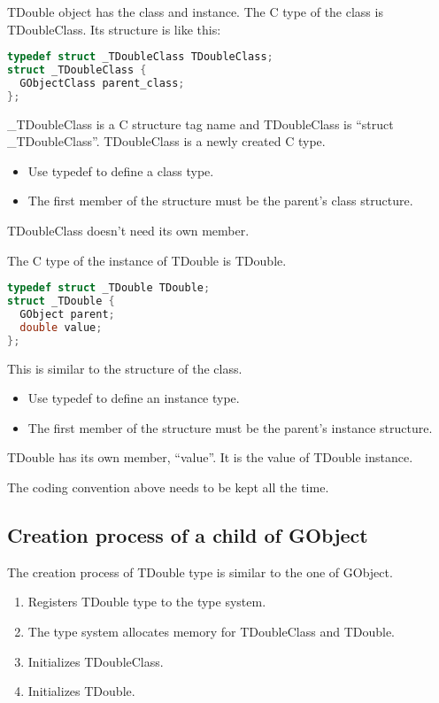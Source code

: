 TDouble object has the class and instance. The C type of the class is
TDoubleClass. Its structure is like this:

\begin{lstlisting}[language=C]
typedef struct _TDoubleClass TDoubleClass;
struct _TDoubleClass {
  GObjectClass parent_class;
};
\end{lstlisting}

\_TDoubleClass is a C structure tag name and TDoubleClass is ``struct
\_TDoubleClass''. TDoubleClass is a newly created C type.

\begin{itemize}
\tightlist
\item
  Use typedef to define a class type.
\item
  The first member of the structure must be the parent's class
  structure.
\end{itemize}

TDoubleClass doesn't need its own member.

The C type of the instance of TDouble is TDouble.

\begin{lstlisting}[language=C]
typedef struct _TDouble TDouble;
struct _TDouble {
  GObject parent;
  double value;
};
\end{lstlisting}

This is similar to the structure of the class.

\begin{itemize}
\tightlist
\item
  Use typedef to define an instance type.
\item
  The first member of the structure must be the parent's instance
  structure.
\end{itemize}

TDouble has its own member, ``value''. It is the value of TDouble
instance.

The coding convention above needs to be kept all the time.

\subsection{Creation process of a child of
GObject}\label{creation-process-of-a-child-of-gobject}

The creation process of TDouble type is similar to the one of GObject.

\begin{enumerate}
\def\labelenumi{\arabic{enumi}.}
\tightlist
\item
  Registers TDouble type to the type system.
\item
  The type system allocates memory for TDoubleClass and TDouble.
\item
  Initializes TDoubleClass.
\item
  Initializes TDouble.
\end{enumerate}

